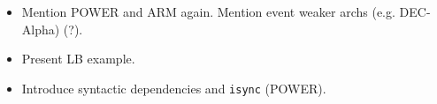 \begin{itemize}
  \item Mention POWER and ARM again. Mention event weaker archs (e.g. DEC-Alpha) (?).
  \item Present LB example. 
  \item Introduce syntactic dependencies and \texttt{isync} (POWER).
\end{itemize}







